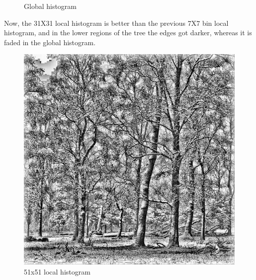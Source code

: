 \documentclass{article}
\begin{document}
\begin{figure}[!htb]
\begin{minipage}[b]{0.45\textwidth}
        \caption{Global histogram}
    \end{minipage}
\end{figure}

Now, the 31X31 local histogram is better than the previous 7X7 bin local histogram, and in the lower regions of the tree the edges got darker, whereas it is faded in the global histogram.

\begin{figure}[!htb]
    \centering
    \begin{minipage}[b]{0.45\textwidth}
        \includegraphics[width=\textwidth]{LC2_local_51.jpg}
        \caption{51x51 local histogram}
    \end{minipage}
    \begin{minipage}[b]{0.45\textwidth}

\end{minipage}
\end{figure}
\end{document}
